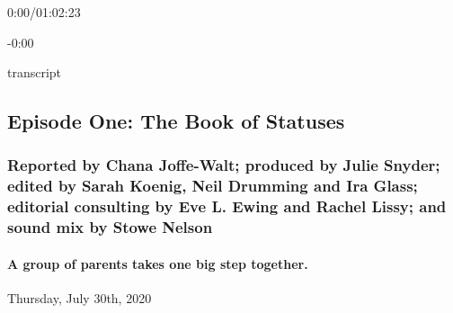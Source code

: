 0:00/01:02:23

-0:00

transcript

\hypertarget{episode-one-the-book-of-statuses-2}{%
\subsection{Episode One: The Book of
Statuses}\label{episode-one-the-book-of-statuses-2}}

\hypertarget{reported-by-chana-joffe-walt-produced-by-julie-snyder-edited-by-sarah-koenig-neil-drumming-and-ira-glass-editorial-consulting-by-eve-l-ewing-and-rachel-lissy-and-sound-mix-by-stowe-nelson-1}{%
\subsubsection{Reported by Chana Joffe-Walt; produced by Julie Snyder;
edited by Sarah Koenig, Neil Drumming and Ira Glass; editorial
consulting by Eve L. Ewing and Rachel Lissy; and sound mix by Stowe
Nelson}\label{reported-by-chana-joffe-walt-produced-by-julie-snyder-edited-by-sarah-koenig-neil-drumming-and-ira-glass-editorial-consulting-by-eve-l-ewing-and-rachel-lissy-and-sound-mix-by-stowe-nelson-1}}

\hypertarget{a-group-of-parents-takes-one-big-step-together-2}{%
\paragraph{A group of parents takes one big step
together.}\label{a-group-of-parents-takes-one-big-step-together-2}}

Thursday, July 30th, 2020

